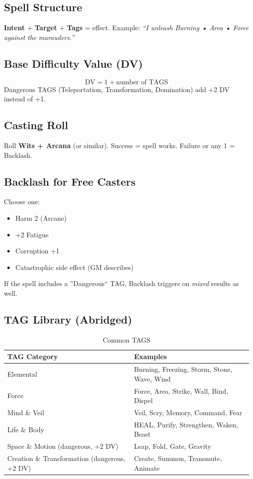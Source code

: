 \subsection{Spell Structure}
\textbf{Intent} + \textbf{Target} + \textbf{Tags} = effect. Example: \textit{``I unleash Burning • Area • Force against the marauders.''}

\subsection{Base Difficulty Value (DV)}
\[
\text{DV} = 1 + \text{number of TAGS}
\]
Dangerous TAGS (Teleportation, Transformation, Domination) add +2 DV instead of +1.

\subsection{Casting Roll}
Roll \textbf{Wits + Arcana} (or similar). Success = spell works. Failure or any 1 = Backlash.

\subsection{Backlash for Free Casters}
Choose one:
\begin{itemize}
    \item Harm 2 (Arcane)
    \item +2 Fatigue
    \item Corruption +1
    \item Catastrophic side effect (GM describes)
\end{itemize}
If the spell includes a ''Dangerous`` TAG, Backlash triggers on \emph{mixed} results as well.

\subsection{TAG Library (Abridged)}\label{subsec:tag_library}

\begin{longtable}{p{3.5cm} p{10cm}}
\caption{Common TAGS}\label{tab:tags_abridged}\\
\toprule
\textbf{TAG Category} & \textbf{Examples} \\
\midrule
Elemental & Burning, Freezing, Storm, Stone, Wave, Wind \\
Force & Force, Area, Strike, Wall, Bind, Dispel \\
Mind \& Veil & Veil, Scry, Memory, Command, Fear \\
Life \& Body & HEAL, Purify, Strengthen, Waken, Beast \\
Space \& Motion (dangerous, +2 DV) & Leap, Fold, Gate, Gravity \\
Creation \& Transformation (dangerous, +2 DV) & Create, Summon, Transmute, Animate \\
\bottomrule
\end{longtable}

